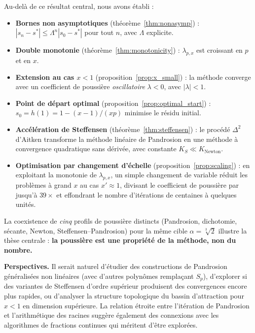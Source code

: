 \documentclass[11pt,a4paper]{article}
\theoremstyle{definition}
\newcommand{\cbrt}[1]{\sqrt[3]{#1}}
\begin{document}
Au-delà de ce résultat central, nous avons établi :
\begin{itemize}
  \item \textbf{Bornes non asymptotiques} (théorème~\ref{thm:nonasymp}) : $|s_n - s^*| \leq \Lambda^n |s_0 - s^*|$ pour tout $n$, avec $\Lambda$ explicite.
  \item \textbf{Double monotonie} (théorème~\ref{thm:monotonicity}) : $\lambda_{p,x}$ est croissant en $p$ et en $x$.
  \item \textbf{Extension au cas $x < 1$} (proposition~\ref{prop:x_small}) : la méthode converge avec un coefficient de poussière \emph{oscillatoire} $\lambda < 0$, avec $|\lambda| < 1$.
  \item \textbf{Point de départ optimal} (proposition~\ref{prop:optimal_start}) : $s_0 = h(1) = 1 - (x-1)/(xp)$ minimise le résidu initial.
  \item \textbf{Accélération de Steffensen} (théorème~\ref{thm:steffensen}) : le procédé $\Delta^2$ d'Aitken transforme la méthode linéaire de Pandrosion en une méthode à convergence quadratique sans dérivée, avec constante $K_S \ll K_{\text{Newton}}$.
  \item \textbf{Optimisation par changement d'échelle} (proposition~\ref{prop:scaling}) : en exploitant la monotonie de $\lambda_{p,x}$, un simple changement de variable réduit les problèmes à grand $x$ au cas $x' \approx 1$, divisant le coefficient de poussière par jusqu'à $39\times$ et effondrant le nombre d'itérations de centaines à quelques unités.
\end{itemize}

\medskip

La coexistence de \emph{cinq} profils de poussière distincts (Pandrosion, dichotomie, sécante, Newton, Steffensen--Pandrosion) pour la même cible $\alpha = \cbrt{2}$ illustre la thèse centrale : \textbf{la poussière est une propriété de la méthode, non du nombre.}

\medskip

\textbf{Perspectives.} Il serait naturel d'étudier des constructions de Pandrosion généralisées non linéaires (avec d'autres polynômes remplaçant $S_p$), d'explorer si des variantes de Steffensen d'ordre supérieur produisent des convergences encore plus rapides, ou d'analyser la structure topologique du bassin d'attraction pour $x < 1$ en dimension supérieure. La relation étroite entre l'itération de Pandrosion et l'arithmétique des racines suggère également des connexions avec les algorithmes de fractions continues qui méritent d'être explorées.
\end{document}
